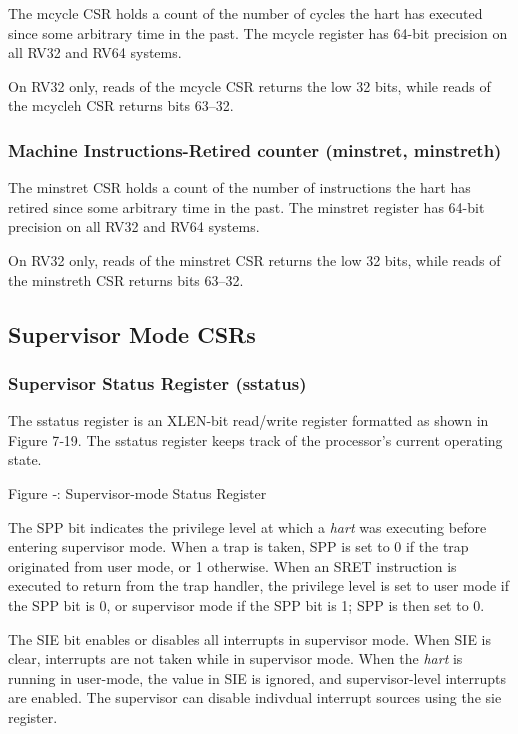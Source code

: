The mcycle CSR holds a count of the number of cycles the hart has
executed since some arbitrary time in the past. The mcycle register has
64-bit precision on all RV32 and RV64 systems.

On RV32 only, reads of the mcycle CSR returns the low 32 bits, while
reads of the mcycleh CSR returns bits 63--32.

\subsubsection{Machine Instructions-Retired counter (minstret,
minstreth)}\label{machine-instructions-retired-counter-minstret-minstreth}

The minstret CSR holds a count of the number of instructions the hart
has retired since some arbitrary time in the past. The minstret register
has 64-bit precision on all RV32 and RV64 systems.

On RV32 only, reads of the minstret CSR returns the low 32 bits, while
reads of the minstreth CSR returns bits 63--32.

\protect\hypertarget{_Toc327108358}{}{}

\subsection{Supervisor Mode CSRs}\label{supervisor-mode-csrs}

\subsubsection{Supervisor Status Register (sstatus)
}\label{supervisor-status-register-sstatus}

The sstatus register is an XLEN-bit read/write register formatted as
shown in Figure 7‑19. The sstatus register keeps track of the
processor's current operating state.

\missingfigure{}

\protect\hypertarget{_Ref367096223}{}{}Figure ‑: Supervisor-mode Status
Register

The SPP bit indicates the privilege level at which a \emph{hart} was
executing before entering supervisor mode. When a trap is taken, SPP is
set to 0 if the trap originated from user mode, or 1 otherwise. When an
SRET instruction is executed to return from the trap handler, the
privilege level is set to user mode if the SPP bit is 0, or supervisor
mode if the SPP bit is 1; SPP is then set to 0.

The SIE bit enables or disables all interrupts in supervisor mode. When
SIE is clear, interrupts are not taken while in supervisor mode. When
the \emph{hart} is running in user-mode, the value in SIE is ignored,
and supervisor-level interrupts are enabled. The supervisor can disable
indivdual interrupt sources using the sie register.

